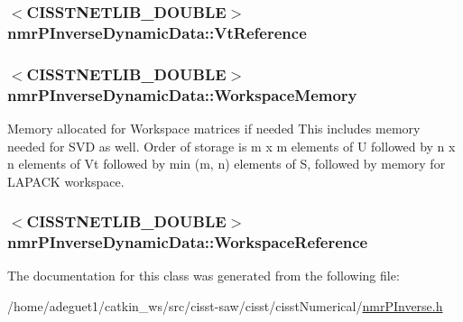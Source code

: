 \hypertarget{classnmr_p_inverse_dynamic_data_a7e7d03c38c284a81d84ba35383acf594}{
\subsubsection[{Vt\-Reference}]{$<$C\-I\-S\-S\-T\-N\-E\-T\-L\-I\-B\-\_\-\-D\-O\-U\-B\-L\-E$>$ nmr\-P\-Inverse\-Dynamic\-Data\-::\-Vt\-Reference\hspace{0.3cm}{\ttfamily [protected]}}}\label{classnmr_p_inverse_dynamic_data_a7e7d03c38c284a81d84ba35383acf594}
\hypertarget{classnmr_p_inverse_dynamic_data_a799d81175e96446fe8ab3553befd26ee}{
\subsubsection[{Workspace\-Memory}]{$<$C\-I\-S\-S\-T\-N\-E\-T\-L\-I\-B\-\_\-\-D\-O\-U\-B\-L\-E$>$ nmr\-P\-Inverse\-Dynamic\-Data\-::\-Workspace\-Memory\hspace{0.3cm}{\ttfamily [protected]}}}\label{classnmr_p_inverse_dynamic_data_a799d81175e96446fe8ab3553befd26ee}
Memory allocated for Workspace matrices if needed This includes memory needed for S\-V\-D as well. Order of storage is m x m elements of U followed by n x n elements of Vt followed by min (m, n) elements of S, followed by memory for L\-A\-P\-A\-C\-K workspace. \hypertarget{classnmr_p_inverse_dynamic_data_af51319d4e7f6a0693f3f23ed52220b5a}{
\subsubsection[{Workspace\-Reference}]{$<$C\-I\-S\-S\-T\-N\-E\-T\-L\-I\-B\-\_\-\-D\-O\-U\-B\-L\-E$>$ nmr\-P\-Inverse\-Dynamic\-Data\-::\-Workspace\-Reference\hspace{0.3cm}{\ttfamily [protected]}}}\label{classnmr_p_inverse_dynamic_data_af51319d4e7f6a0693f3f23ed52220b5a}


The documentation for this class was generated from the following file\-:\begin{DoxyCompactItemize}
\item 
/home/adeguet1/catkin\-\_\-ws/src/cisst-\/saw/cisst/cisst\-Numerical/\hyperlink{nmr_p_inverse_8h}{nmr\-P\-Inverse.\-h}\end{DoxyCompactItemize}
